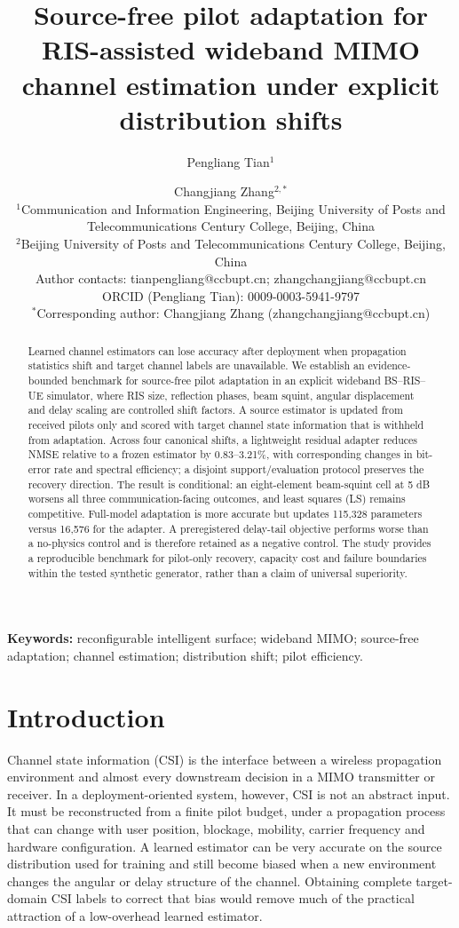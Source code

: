 \documentclass[10pt,twocolumn]{article}
\title{Source-free pilot adaptation for RIS-assisted wideband MIMO channel estimation under explicit distribution shifts}
\author{Pengliang Tian$^{1}$ \and Changjiang Zhang$^{2,*}$\\[-2pt]
\small $^{1}$Communication and Information Engineering, Beijing University of Posts and Telecommunications Century College, Beijing, China\\
\small $^{2}$Beijing University of Posts and Telecommunications Century College, Beijing, China\\
\small Author contacts: tianpengliang@ccbupt.cn; zhangchangjiang@ccbupt.cn\\
\small ORCID (Pengliang Tian): 0009-0003-5941-9797\\
\small $^{*}$Corresponding author: Changjiang Zhang (zhangchangjiang@ccbupt.cn)}
\date{}
\begin{document}
\maketitle

\begin{abstract}
Learned channel estimators can lose accuracy after deployment when propagation statistics shift and target channel labels are unavailable. We establish an evidence-bounded benchmark for source-free pilot adaptation in an explicit wideband BS--RIS--UE simulator, where RIS size, reflection phases, beam squint, angular displacement and delay scaling are controlled shift factors. A source estimator is updated from received pilots only and scored with target channel state information that is withheld from adaptation. Across four canonical shifts, a lightweight residual adapter reduces NMSE relative to a frozen estimator by 0.83--3.21\%, with corresponding changes in bit-error rate and spectral efficiency; a disjoint support/evaluation protocol preserves the recovery direction. The result is conditional: an eight-element beam-squint cell at 5 dB worsens all three communication-facing outcomes, and least squares (LS) remains competitive. Full-model adaptation is more accurate but updates 115,328 parameters versus 16,576 for the adapter. A preregistered delay-tail objective performs worse than a no-physics control and is therefore retained as a negative control. The study provides a reproducible benchmark for pilot-only recovery, capacity cost and failure boundaries within the tested synthetic generator, rather than a claim of universal superiority.
\end{abstract}

\textbf{Keywords:} reconfigurable intelligent surface; wideband MIMO; source-free adaptation; channel estimation; distribution shift; pilot efficiency.

\section{Introduction}

Channel state information (CSI) is the interface between a wireless propagation environment and almost every downstream decision in a MIMO transmitter or receiver. In a deployment-oriented system, however, CSI is not an abstract input. It must be reconstructed from a finite pilot budget, under a propagation process that can change with user position, blockage, mobility, carrier frequency and hardware configuration. A learned estimator can be very accurate on the source distribution used for training and still become biased when a new environment changes the angular or delay structure of the channel. Obtaining complete target-domain CSI labels to correct that bias would remove much of the practical attraction of a low-overhead learned estimator.
\end{document}
